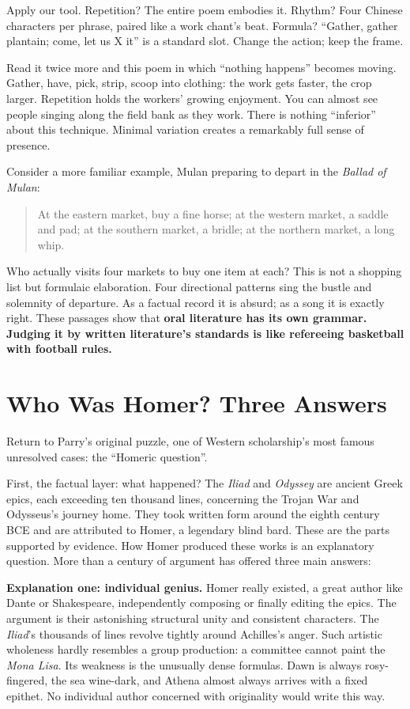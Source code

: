 Apply our tool. Repetition? The entire poem embodies it. Rhythm? Four Chinese characters per phrase, paired like a work chant's beat. Formula? ``Gather, gather plantain; come, let us X it'' is a standard slot. Change the action; keep the frame.

Read it twice more and this poem in which ``nothing happens'' becomes moving. Gather, have, pick, strip, scoop into clothing: the work gets faster, the crop larger. Repetition holds the workers' growing enjoyment. You can almost see people singing along the field bank as they work. There is nothing ``inferior'' about this technique. Minimal variation creates a remarkably full sense of presence.

Consider a more familiar example, Mulan preparing to depart in the \emph{Ballad of Mulan}:

\begin{quote}
At the eastern market, buy a fine horse; at the western market, a saddle and pad; at the southern market, a bridle; at the northern market, a long whip.
\end{quote}
Who actually visits four markets to buy one item at each? This is not a shopping list but formulaic elaboration. Four directional patterns sing the bustle and solemnity of departure. As a factual record it is absurd; as a song it is exactly right. These passages show that \textbf{oral literature has its own grammar. Judging it by written literature's standards is like refereeing basketball with football rules.}

\section{Who Was Homer? Three Answers}
Return to Parry's original puzzle, one of Western scholarship's most famous unresolved cases: the ``Homeric question''.

First, the factual layer: what happened? The \emph{Iliad} and \emph{Odyssey} are ancient Greek epics, each exceeding ten thousand lines, concerning the Trojan War and Odysseus's journey home. They took written form around the eighth century BCE and are attributed to Homer, a legendary blind bard. These are the parts supported by evidence. How Homer produced these works is an explanatory question. More than a century of argument has offered three main answers:

\textbf{Explanation one: individual genius.} Homer really existed, a great author like Dante or Shakespeare, independently composing or finally editing the epics. The argument is their astonishing structural unity and consistent characters. The \emph{Iliad}'s thousands of lines revolve tightly around Achilles's anger. Such artistic wholeness hardly resembles a group production: a committee cannot paint the \emph{Mona Lisa}. Its weakness is the unusually dense formulas. Dawn is always rosy-fingered, the sea wine-dark, and Athena almost always arrives with a fixed epithet. No individual author concerned with originality would write this way.

